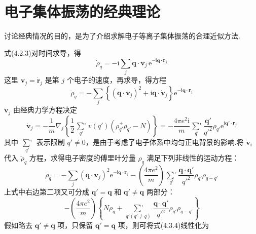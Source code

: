 \section{电子集体振荡的经典理论}

讨论经典情况的目的，是为了介绍求解电子等离子集体振荡的合理近似方法.

式(4.2.3)对时间求导，得
\begin{equation}
  \dot{\rho}_{q}=-\mathrm{i}\sum_{j}\boldsymbol{q}\cdot\boldsymbol{v}_{j}\,
  \mathrm{e}^{-\mathrm{i}\boldsymbol{q}\cdot\boldsymbol{r}_{j}}
\end{equation}
这里 $\boldsymbol{v}_{j}=\dot{\boldsymbol{r}}_{j}$ 是第 $j$ 个电子的速度，再求导，得方程
\begin{equation}
  \ddot{\rho}_{q}=-\sum_{j}\left\{\left(\boldsymbol{q}\cdot\boldsymbol{v}_{j}\right)^{2}
  +\mathrm{i}\boldsymbol{q}\cdot\dot{\boldsymbol{v}}_{j}\right\}
  \mathrm{e}^{-\mathrm{i}\boldsymbol{q}\cdot\boldsymbol{r}_{j}}
\end{equation}
$\dot{\boldsymbol{v}}_{j}$ 由经典力学方程决定
\begin{equation}
  \dot{\boldsymbol{v}}_{j}=-\frac{1}{m}\nabla_{j}
  \left\{\frac{1}{2}\mathop{{\sum}'}\limits_{q'}v(q')
  \left(\rho_{q'}^{+}\rho_{q'}-N\right)\right\}
  =-\frac{4\pi e^{2}\mathrm{i}}{m}\mathop{{\sum}'}\limits_{q'}
  \frac{\boldsymbol{q}'}{q'^{2}}\rho_{q'}\mathrm{e}^{\mathrm{i}\boldsymbol{q}'\cdot\boldsymbol{r}_{j}}
\end{equation}
其中 $\mathop{{\sum}'}\limits_{q'}$ 表示限制 $q'\neq 0$，是由于考虑了电子体系中均匀正电背景的影响.将 $\dot{\boldsymbol{v}}_{i}$ 代入 $\ddot{\rho}_{q}$ 方程，求得电子密度的傅里叶分量 $\rho_{q}$ 满足下列非线性的运动方程：
\begin{equation}
  \ddot{\rho}_{q}=-\sum_{j}\left(\boldsymbol{q}\cdot\boldsymbol{v}_{j}\right)^{2}
  \mathrm{e}^{-\mathrm{i}\boldsymbol{q}\cdot\boldsymbol{r}_{j}}
  -\left(\frac{4\pi e^{2}}{m}\right)\mathop{{\sum}'}\limits_{q'}
  \frac{\boldsymbol{q}\cdot\boldsymbol{q}'}{q'^{2}}\rho_{q'}\rho_{q-q'}
\end{equation}
上式中右边第二项又可分成 $\boldsymbol{q}'=\boldsymbol{q}$ 和 $\boldsymbol{q}'\neq\boldsymbol{q}$ 两部分：
\begin{equation}
  -\left(\frac{4\pi e^{2}}{m}\right)
  \left\{N\rho_{q}+\mathop{{\sum}'}\limits_{q'(q'\neq q)}
  \frac{\boldsymbol{q}\cdot\boldsymbol{q}'}{q'^{2}}\rho_{q'}\rho_{q-q'}\right\}
\end{equation}
假如略去 $\boldsymbol{q}'\neq\boldsymbol{q}$ 项，只保留 $\boldsymbol{q}'=\boldsymbol{q}$ 项，则可将式(4.3.4)线性化为
